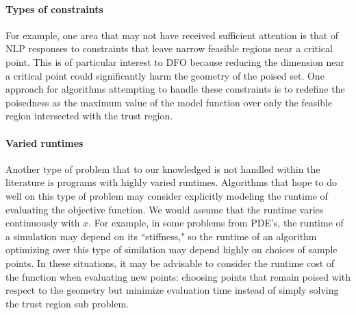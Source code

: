 \documentclass{article}
\begin{document}
\paragraph{Types of constraints}

For example, one area that may not have received sufficient attention is that of NLP responses to constraints that leave narrow feasible regions near a critical point.
This is of particular interest to DFO because reducing the dimension near a critical point could significantly harm the geometry of the poised set.
One approach for algorithms attempting to handle these constraints is to redefine the poisedness as the maximum value of the model function over only the feasible region intersected with the trust region.

\paragraph{Varied runtimes}

Another type of problem that to our knowledged is not handled within the literature is programs with highly varied runtimes.
Algorithms that hope to do well on this type of problem may consider explicitly modeling the runtime of evaluating the objective function.
We would assume that the runtime varies continuously with $x$.
For example, in some problems from PDE's, the runtime of a simulation may depend on its ``stiffness," 
so the runtime of an algorithm optimizing over this type of similation may depend highly on choices of sample points.
In these situations, it may be advisable to consider the runtime cost of the function when evaluating new points:
choosing points that remain poised with respect to the geometry but minimize evaluation time instead of simply solving the trust region sub problem.


\end{document}
